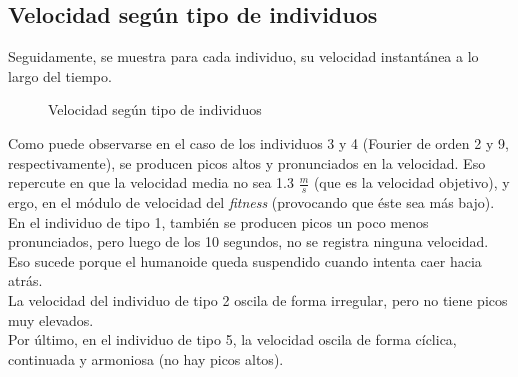 \documentclass{article}
\begin{document}
\subsection{Velocidad seg\'un tipo de individuos}
Seguidamente, se muestra para cada individuo, su velocidad instant\'anea a lo largo del tiempo.
\begin{figure}[H]%
  \centering
  \caption{Velocidad seg\'un tipo de individuos}%
  \label{fig:resultados_velocidad} %
\end{figure}
\noindent Como puede observarse en el caso de los individuos 3 y 4 (Fourier de orden 2 y 9, respectivamente), se producen picos altos y pronunciados en la velocidad. Eso repercute en que la velocidad media no sea 1.3 $\frac{m}{s}$ (que es la velocidad objetivo), y ergo, en el m\'odulo de velocidad del \textit{fitness} (provocando que \'este sea m\'as bajo).\\
En el individuo de tipo 1, tambi\'en se producen picos un poco menos pronunciados, pero luego de los 10 segundos, no se registra ninguna velocidad. Eso sucede porque el humanoide queda suspendido cuando intenta caer hacia atr\'as.\\
La velocidad del individuo de tipo 2 oscila de forma irregular, pero no tiene picos muy elevados.\\ 
Por \'ultimo, en el individuo de tipo 5, la velocidad oscila de forma c\'iclica, continuada y armoniosa (no hay picos altos).
\end{document}
